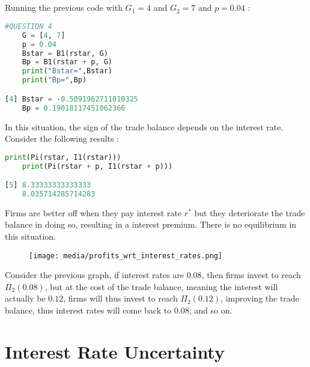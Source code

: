 \documentclass{article}
\begin{document}
\subsection{}
Running the previous code with $G_1 = 4$ and $G_2 = 7$ and $p = 0.04$ :
\begin{lstlisting}[language=Python, label=python_code]
    #QUESTION 4
    G = [4, 7]
    p = 0.04
    Bstar = B1(rstar, G)
    Bp = B1(rstar + p, G)
    print("Bstar=",Bstar)
    print("Bp=",Bp)

[4] Bstar = -0.5091962711010325
    Bp = 0.19018117451062366
\end{lstlisting}
In this situation, the sign of the trade balance depends on the interest rate. Consider the following results :
\begin{lstlisting}[language=Python, label=python_code]
    print(Pi(rstar, I1(rstar)))
    print(Pi(rstar + p, I1(rstar + p)))

[5] 8.33333333333333
    8.035714285714283
\end{lstlisting}
Firms are better off when they pay interest rate $r^*$ but they deteriorate the trade balance in doing so, resulting in a interest premium. There is no equilibrium in this situation.
\begin{figure}[H]
    \centering
    \texttt{[image: media/profits\_wrt\_interest\_rates.png]}
    \label{fig:mon_graphique}
\end{figure}
Consider the previous graph, if interest rates are $0.08$, then firms invest to reach $\Pi_2(0.08)$, but at the cost of the trade balance, meaning the interest will actually be $0.12$, firms will thus invest to reach $\Pi_2(0.12)$, improving the trade balance, thus interest rates will come back to $0.08$, and so on.
\newpage





\section{Interest Rate Uncertainty}
\end{document}
